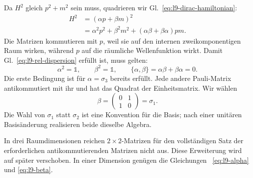 Da \(H^2\) gleich \(p^2+m^2\) sein muss, quadrieren wir Gl.~\eqref{eq:l9-dirac-hamiltonian}:
\begin{align}
H^2
&=(\alpha p+\beta m)^2\\
&=\alpha^2p^2+\beta^2m^2
+(\alpha\beta+\beta\alpha)pm.
\label{eq:l9-square-dirac}
\end{align}
Die Matrizen kommutieren mit \(p\), weil sie auf den internen zweikomponentigen Raum wirken, während \(p\) auf die räumliche Wellenfunktion wirkt. Damit Gl.~\eqref{eq:l9-rel-dispersion} erfüllt ist, muss gelten:
\begin{equation}
\alpha^2=\mathbb{1},
\qquad
\beta^2=\mathbb{1},
\qquad
\{\alpha,\beta\}
=\alpha\beta+\beta\alpha=0.
\label{eq:l9-dirac-algebra}
\end{equation}
Die erste Bedingung ist für \(\alpha=\sigma_3\) bereits erfüllt. Jede andere Pauli-Matrix antikommutiert mit ihr und hat das Quadrat der Einheitsmatrix. Wir wählen
\begin{equation}
\beta=
\begin{pmatrix}
0&1\\
1&0
\end{pmatrix}
=\sigma_1.
\label{eq:l9-beta}
\end{equation}
Die Wahl von \(\sigma_1\) statt \(\sigma_2\) ist eine Konvention für die Basis; nach einer unitären Basisänderung realisieren beide dieselbe Algebra.

\begin{classroomqa}
\end{classroomqa}

\begin{classroomqa}
\end{classroomqa}

In drei Raumdimensionen reichen \(2\times2\)-Matrizen für den vollständigen Satz der erforderlichen antikommutierenden Matrizen nicht aus. Diese Erweiterung wird auf später verschoben. In einer Dimension genügen die Gleichungen ~\eqref{eq:l9-alpha} und \eqref{eq:l9-beta}.

